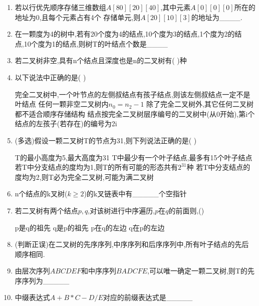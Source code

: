 \documentclass[12pt, a4paper, oneside, UTF8]{ctexbook}
\begin{document}
\begin{enumerate}
    \item 若以行优先顺序存储三维数组$A[80][20][40]$,其中元素$A[0][0][0]$所在的地址为0,且每个元素占有4个
    存储单元,则$A[20][10][3]$的地址为\_\_\_\_. 

    \item \bl 在一颗度为4的树中,若有20个度为4的结点,10个度为3的结点,1个度为2的结点,10个度为1的结点,则树T的叶结点个数是\_\_\_\_
    
    \item 若二叉树非空,具有n个结点且深度也是n的二叉树有(    )种 

    \item 以下说法中正确的是(   ) 
    \begin{choices}[1]
        \task 完全二叉树中,一个叶节点的左侧叔结点有孩子结点,则该左侧叔结点一定不是叶结点 
        \task 任何一颗非空二叉树内$n_0=n_2-1$ 
        \task 除了完全二叉树外,其它任何二叉树都不适合顺序存储结构 
        \task 结点按完全二叉树层序编号的二叉树中(从0开始),第i个结点的左孩子(若存在)的编号为2i 
    \end{choices}

    \item (多选)假设一颗二叉树T的节点为31,则下列说法正确的是(   ) 
    \begin{choices}[1]
        \task T的最小高度为5,最大高度为31 
        \task T中最少有一个叶子结点,最多有15个叶子结点 
        \task 若T中分支结点的度均为1,则T的所有可能的形态共有$2^31$种 
        \task 若T中分支结点的度均为2,则T必为完全二叉树,可能为满二叉树 
    \end{choices}

    \item n个结点的k叉树($k\geq 2$)的k叉链表中有\_\_\_\_\_个空指针 

    \item 若二叉树有两个结点$p,q$,对该树进行中序遍历,$p$在$q$的前面则,() 
    \begin{choices}
        \task p是q的祖先 
        \task q是p的祖先 
        \task p在q的左边 
        \task q在p的左边
    \end{choices}

    \item (判断正误)在二叉树的先序序列,中序序列和后序序列中,所有叶子结点的先后顺序相同. 
    
    \item 由层次序列$ABCDEF$和中序序列$BADCFE$,可以唯一确定一颗二叉树,则T的先序序列为\_\_\_\_\_ 

    \item 中缀表达式$A+B*C-D/E$对应的前缀表达式是\_\_\_\_\_ 


\end{enumerate}
\end{document}
